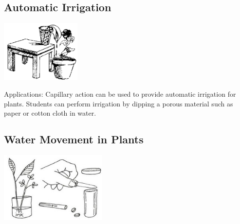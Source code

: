 \begin{multicols}{2}
\subsection{Automatic Irrigation}

\begin{center}
\includegraphics[width=0.3\textwidth]{./img/source/irrigation.png}
\end{center}

\begin{description*}
\item[Applications:]{Capillary action can be used to provide automatic irrigation for plants. Students can perform irrigation by dipping a porous material such as paper or cotton cloth in water.}
\end{description*}

\subsection{Water Movement in Plants} %

\begin{center}
\includegraphics[width=0.4\textwidth]{./img/vso/water-movement.jpg}
\end{center}


\end{multicols}
